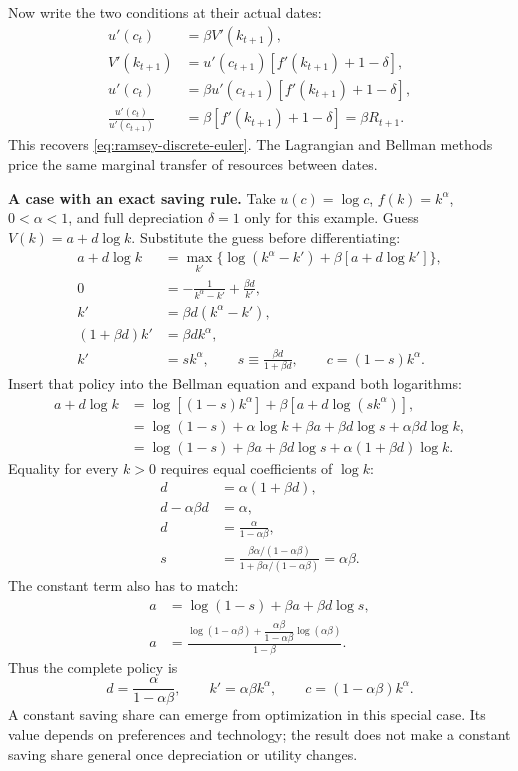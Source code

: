 Now write the two conditions at their actual dates:
\begin{align}
u'(c_t)&=\beta V'(k_{t+1}),\\
V'(k_{t+1})&=u'(c_{t+1})[f'(k_{t+1})+1-\delta],\\
u'(c_t)&=\beta u'(c_{t+1})[f'(k_{t+1})+1-\delta],\\
\frac{u'(c_t)}{u'(c_{t+1})}
 &=\beta[f'(k_{t+1})+1-\delta]=\beta R_{t+1}.
\end{align}
This recovers \eqref{eq:ramsey-discrete-euler}. The Lagrangian and Bellman
methods price the same marginal transfer of resources between dates.

\textbf{A case with an exact saving rule.}
Take $u(c)=\log c$, $f(k)=k^\alpha$, $0<\alpha<1$, and full depreciation
$\delta=1$ only for this example. Guess $V(k)=a+d\log k$. Substitute the
guess before differentiating:
\begin{align}
a+d\log k
 &=\max_{k'}\{\log(k^\alpha-k')+\beta[a+d\log k']\},\\
0&=-\frac{1}{k^\alpha-k'}+\frac{\beta d}{k'},\\
k'&=\beta d(k^\alpha-k'),\\
(1+\beta d)k'&=\beta d k^\alpha,\\
k'&=s k^\alpha,\qquad
s\equiv\frac{\beta d}{1+\beta d},\qquad c=(1-s)k^\alpha.
\end{align}
Insert that policy into the Bellman equation and expand both logarithms:
\begin{align}
a+d\log k
 &=\log[(1-s)k^\alpha]+\beta[a+d\log(sk^\alpha)],\\
 &=\log(1-s)+\alpha\log k+\beta a
    +\beta d\log s+\alpha\beta d\log k,\\
 &=\log(1-s)+\beta a+\beta d\log s
    +\alpha(1+\beta d)\log k.
\end{align}
Equality for every $k>0$ requires equal coefficients of $\log k$:
\begin{align}
d&=\alpha(1+\beta d),\\
d-\alpha\beta d&=\alpha,\\
d&=\frac{\alpha}{1-\alpha\beta},\\
s&=\frac{\beta\alpha/(1-\alpha\beta)}
        {1+\beta\alpha/(1-\alpha\beta)}=\alpha\beta.
\end{align}
The constant term also has to match:
\begin{align}
a&=\log(1-s)+\beta a+\beta d\log s,\\
a&=\frac{\log(1-\alpha\beta)
     +\dfrac{\alpha\beta}{1-\alpha\beta}\log(\alpha\beta)}{1-\beta}.
\end{align}
Thus the complete policy is
\begin{equation}\label{eq:ramsey-exact-saving}
d=\frac{\alpha}{1-\alpha\beta},\qquad
k'=\alpha\beta k^\alpha,\qquad c=(1-\alpha\beta)k^\alpha.
\end{equation}
A constant saving share can emerge from optimization in this special case.
Its value depends on preferences and technology; the result does not make
a constant saving share general once depreciation or utility changes.

